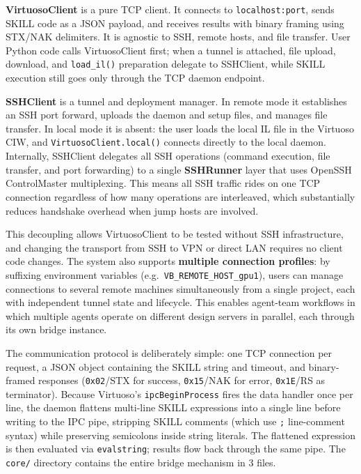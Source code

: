 \documentclass[lettersize,journal]{ieee_template/IEEEtran}
\begin{document}
\textbf{VirtuosoClient} is a pure TCP client. It connects to \texttt{localhost:port}, sends SKILL code as a JSON payload, and receives results with binary framing using STX/NAK delimiters. It is agnostic to SSH, remote hosts, and file transfer. User Python code calls VirtuosoClient first; when a tunnel is attached, file upload, download, and \texttt{load\_il()} preparation delegate to SSHClient, while SKILL execution still goes only through the TCP daemon endpoint.

\textbf{SSHClient} is a tunnel and deployment manager. In remote mode it establishes an SSH port forward, uploads the daemon and setup files, and manages file transfer. In local mode it is absent: the user loads the local IL file in the Virtuoso CIW, and \texttt{VirtuosoClient.local()} connects directly to the local daemon. Internally, SSHClient delegates all SSH operations (command execution, file transfer, and port forwarding) to a single \textbf{SSHRunner} layer that uses OpenSSH ControlMaster multiplexing. This means all SSH traffic rides on one TCP connection regardless of how many operations are interleaved, which substantially reduces handshake overhead when jump hosts are involved.

This decoupling allows VirtuosoClient to be tested without SSH infrastructure, and changing the transport from SSH to VPN or direct LAN requires no client code changes. The system also supports \textbf{multiple connection profiles}: by suffixing environment variables (e.g.\ \texttt{VB\_REMOTE\_HOST\_gpu1}), users can manage connections to several remote machines simultaneously from a single project, each with independent tunnel state and lifecycle. This enables agent-team workflows in which multiple agents operate on different design servers in parallel, each through its own bridge instance.

The communication protocol is deliberately simple: one TCP connection per request, a JSON object containing the SKILL string and timeout, and binary-framed responses (\texttt{0x02}/STX for success, \texttt{0x15}/NAK for error, \texttt{0x1E}/RS as terminator). Because Virtuoso's \texttt{ipcBeginProcess} fires the data handler once per line, the daemon flattens multi-line SKILL expressions into a single line before writing to the IPC pipe, stripping SKILL comments (which use \texttt{;} line-comment syntax) while preserving semicolons inside string literals. The flattened expression is then evaluated via \texttt{evalstring}; results flow back through the same pipe. The \texttt{core/} directory contains the entire bridge mechanism in 3 files.
\end{document}
